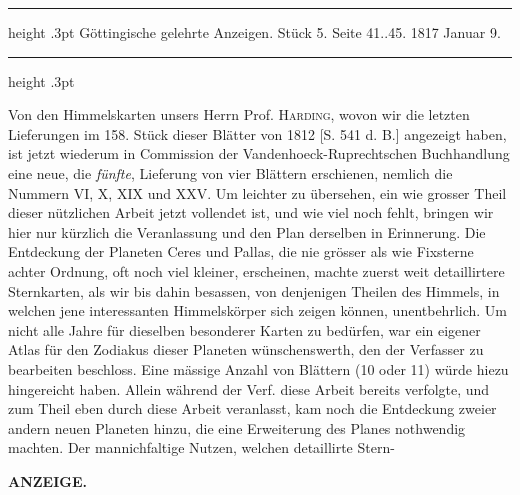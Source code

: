 \par\bigskip
\hypertarget{native-598-lower}{}
\begin{center}
\parbox{.79\linewidth}{%
\centering\small
\hrule height .3pt\relax\vspace{2.5pt}
Göttingische gelehrte Anzeigen. Stück 5. Seite 41..45. 1817 Januar 9.\par
\vspace{2.5pt}\hrule height .3pt\relax
}
\end{center}

Von den Himmelskarten unsers Herrn Prof. \textsc{Harding}, wovon wir die letzten Lieferungen im 158. Stück dieser Blätter von 1812 [S. 541 d. B.] angezeigt haben, ist jetzt wiederum in Commission der Vandenhoeck-Ruprechtschen Buchhandlung eine neue, die \emph{fünfte}, Lieferung von vier Blättern erschienen, nemlich die Nummern VI, X, XIX und XXV. Um leichter zu übersehen, ein wie grosser Theil dieser nützlichen Arbeit jetzt vollendet ist, und wie viel noch fehlt, bringen wir hier nur kürzlich die Veranlassung und den Plan derselben in Erinnerung. Die Entdeckung der Planeten Ceres und Pallas, die nie grösser als wie Fixsterne achter Ordnung, oft noch viel kleiner, erscheinen, machte zuerst weit detaillirtere Sternkarten, als wir bis dahin besassen, von denjenigen Theilen des Himmels, in welchen jene interessanten Himmelskörper sich zeigen können, unentbehrlich. Um nicht alle Jahre für dieselben besonderer Karten zu bedürfen, war ein eigener Atlas für den Zodiakus dieser Planeten wünschenswerth, den der Verfasser zu bearbeiten beschloss. Eine mässige Anzahl von Blättern (10 oder 11) würde hiezu hingereicht haben. Allein während der Verf. diese Arbeit bereits verfolgte, und zum Theil eben durch diese Arbeit veranlasst, kam noch die Entdeckung zweier andern neuen Planeten hinzu, die eine Erweiterung des Planes nothwendig machten. Der mannichfaltige Nutzen, welchen detaillirte Stern-\par
{}
\clearpage
\thispagestyle{empty}
\noindent{}%
%
\parbox[t]{\dimexpr\linewidth-24mm\relax}{\centering\footnotesize\bfseries ANZEIGE.\par}%
\makebox[12mm][r]{}\par\medskip
